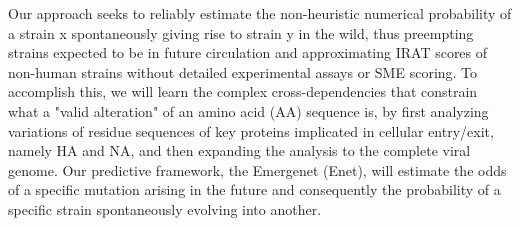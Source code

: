 \documentclass[onecolumn, compsoc,12pt]{IEEEtran}
\begin{document}

\clearpage




Our approach seeks to reliably estimate the non-heuristic numerical probability of a strain x spontaneously giving rise to strain y in the wild, thus preempting strains expected to be in future circulation and approximating IRAT scores of non-human strains without detailed experimental assays or SME scoring. To accomplish this, we will learn the complex cross-dependencies that constrain what a "valid alteration" of an amino acid (AA) sequence is, by first analyzing variations of residue sequences of key proteins implicated in cellular entry/exit, namely HA and NA, and then expanding the analysis to the complete viral genome. Our predictive framework, the Emergenet (Enet), will estimate the odds of a specific mutation arising in the future and consequently the probability of a specific strain spontaneously evolving into another.
\end{document}
